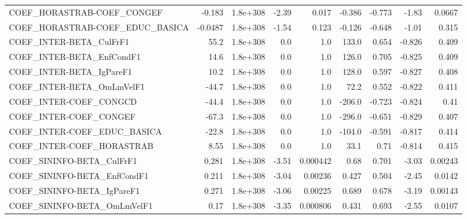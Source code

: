 \begin{tabular}{lrrrrrrrr}
COEF\_HORASTRAB-COEF\_CONGEF            &      -0.183 &     1.8e+308 &   -2.39 &    0.017 &     -0.386 &      -0.773 &        -1.83 &        0.0667 \\
COEF\_HORASTRAB-COEF\_EDUC\_BASICA       &     -0.0487 &     1.8e+308 &   -1.54 &    0.123 &     -0.126 &      -0.648 &        -1.01 &         0.315 \\
COEF\_INTER-BETA\_CulFrF1               &        55.2 &     1.8e+308 &     0.0 &      1.0 &      133.0 &       0.654 &       -0.826 &         0.409 \\
COEF\_INTER-BETA\_EnfCondF1             &        14.6 &     1.8e+308 &     0.0 &      1.0 &      126.0 &       0.705 &       -0.825 &         0.409 \\
COEF\_INTER-BETA\_IgPareF1              &        10.2 &     1.8e+308 &     0.0 &      1.0 &      128.0 &       0.597 &       -0.827 &         0.408 \\
COEF\_INTER-BETA\_OmLmVelF1             &       -44.7 &     1.8e+308 &     0.0 &      1.0 &       72.2 &       0.552 &       -0.822 &         0.411 \\
COEF\_INTER-COEF\_CONGCD                &       -44.4 &     1.8e+308 &     0.0 &      1.0 &     -206.0 &      -0.723 &       -0.824 &          0.41 \\
COEF\_INTER-COEF\_CONGEF                &       -67.3 &     1.8e+308 &     0.0 &      1.0 &     -296.0 &      -0.651 &       -0.829 &         0.407 \\
COEF\_INTER-COEF\_EDUC\_BASICA           &       -22.8 &     1.8e+308 &     0.0 &      1.0 &     -104.0 &      -0.591 &       -0.817 &         0.414 \\
COEF\_INTER-COEF\_HORASTRAB             &        8.55 &     1.8e+308 &     0.0 &      1.0 &       33.1 &        0.71 &       -0.814 &         0.415 \\
COEF\_SININFO-BETA\_CulFrF1             &       0.281 &     1.8e+308 &   -3.51 & 0.000442 &       0.68 &       0.701 &        -3.03 &       0.00243 \\
COEF\_SININFO-BETA\_EnfCondF1           &       0.211 &     1.8e+308 &   -3.04 &  0.00236 &      0.427 &       0.504 &        -2.45 &        0.0142 \\
COEF\_SININFO-BETA\_IgPareF1            &       0.271 &     1.8e+308 &   -3.06 &  0.00225 &      0.689 &       0.678 &        -3.19 &       0.00143 \\
COEF\_SININFO-BETA\_OmLmVelF1           &        0.17 &     1.8e+308 &   -3.35 & 0.000806 &      0.431 &       0.693 &        -2.55 &        0.0107 \\

\end{tabular}
